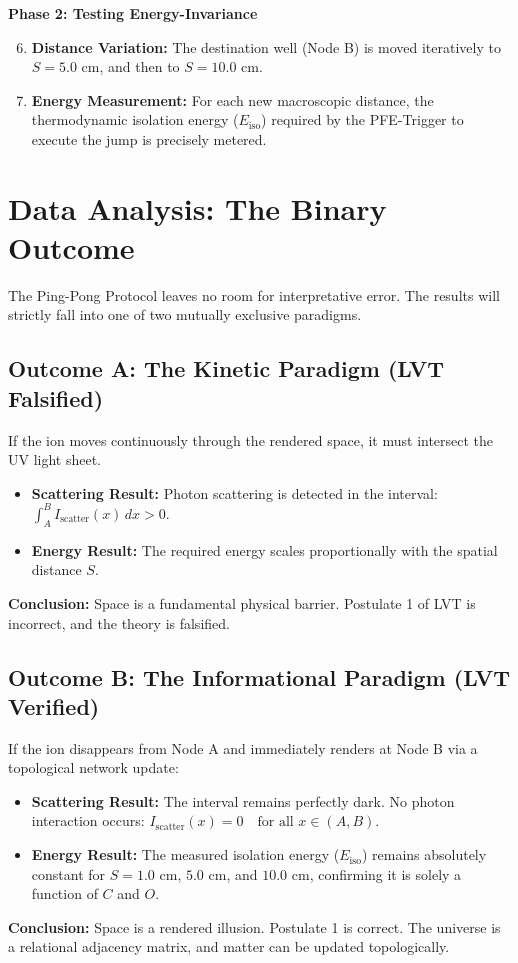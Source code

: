 \documentclass[12pt,a4paper]{article}
\begin{document}
\textbf{Phase 2: Testing Energy-Invariance}
\begin{enumerate}
    \setcounter{enumi}{5}
    \item \textbf{Distance Variation:} The destination well (Node B) is moved iteratively to $S = 5.0$ cm, and then to $S = 10.0$ cm.
        \item \textbf{Energy Measurement:} For each new macroscopic distance, the thermodynamic isolation energy ($E_{\mathrm{iso}}$) required by the PFE-Trigger to execute the jump is precisely metered.

\end{enumerate}


\section{Data Analysis: The Binary Outcome}
The Ping-Pong Protocol leaves no room for interpretative error. The results will strictly fall into one of two mutually exclusive paradigms.

\subsection{Outcome A: The Kinetic Paradigm (LVT Falsified)}
If the ion moves continuously through the rendered space, it must intersect the UV light sheet.
\begin{itemize}
    \item \textbf{Scattering Result:} Photon scattering is detected in the interval: $\int_{A}^{B} I_{\mathrm{scatter}}(x) \, dx > 0$.
    \item \textbf{Energy Result:} The required energy scales proportionally with the spatial distance $S$.
\end{itemize}
\textbf{Conclusion:} Space is a fundamental physical barrier. Postulate 1 of LVT is incorrect, and the theory is falsified.

\subsection{Outcome B: The Informational Paradigm (LVT Verified)}
If the ion disappears from Node A and immediately renders at Node B via a topological network update:
\begin{itemize}
    \item \textbf{Scattering Result:} The interval remains perfectly dark. No photon interaction occurs: $I_{\mathrm{scatter}}(x) = 0 \quad \text{for all } x \in (A, B)$.
        \item \textbf{Energy Result:} The measured isolation energy ($E_{\mathrm{iso}}$) remains absolutely constant for $S = 1.0$ cm, $5.0$ cm, and $10.0$ cm, confirming it is solely a function of $C$ and $O$.

\end{itemize}
\textbf{Conclusion:} Space is a rendered illusion. Postulate 1 is correct. The universe is a relational adjacency matrix, and matter can be updated topologically.
\end{document}
